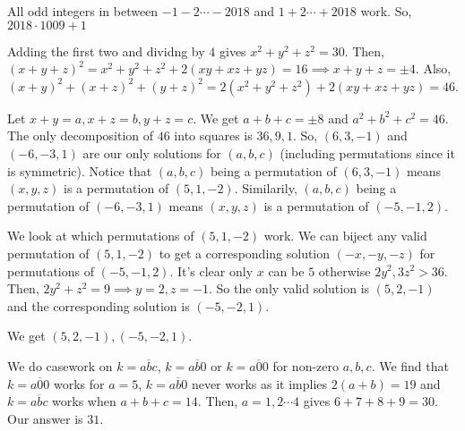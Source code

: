 \documentclass[11pt]{article}
\begin{document}

\begin{sol}
All odd integers in between $-1-2\cdots - 2018$ and $1+2\cdots + 2018$ work. So, $\boxed{2018\cdot 1009+1}$
\end{sol}

\begin{sol} 
Adding the first two and dividng by $4$ gives $x^2+y^2+z^2=30$. Then, $(x+y+z)^2=x^2+y^2+z^2+2(xy+xz+yz)=16\implies x+y+z=\pm 4$. Also, $(x+y)^2+(x+z)^2+(y+z)^2=2(x^2+y^2+z^2)+2(xy+xz+yz)=46$. 

Let $x+y=a, x+z=b, y+z=c$. We get $a+b+c=\pm 8$ and $a^2+b^2+c^2=46$. The only decomposition of $46$ into squares is $36,9,1$. So, $(6,3,-1)$ and $(-6,-3,1)$ are our only solutions for $(a,b,c)$ (including permutations since it is symmetric). Notice that $(a,b,c)$ being a permutation of $(6,3,-1)$ means $(x,y,z)$ is a permutation of $(5,1,-2)$. Similarily, $(a,b,c)$ being a permutation of $(-6,-3,1)$ means $(x,y,z)$ is a permutation of $(-5,-1,2)$.

We look at which permutations of $(5,1,-2)$ work. We can biject any valid permutation of $(5,1,-2)$ to get a corresponding solution $(-x,-y,-z)$ for permutations of $(-5,-1,2)$. It's clear only $x$ can be $5$ otherwise $2y^2,3z^2>36$. Then, $2y^2+z^2=9\implies y=2,z=-1$. So the only valid solution is $(5,2,-1)$ and the corresponding solution is $(-5,-2,1)$.

We get $\boxed{(5,2,-1),(-5,-2,1)}$.
\end{sol}


\begin{sol}
We do casework on $k=\overline{abc}$, $k=\overline{ab0}$ or $k=\overline{a00}$ for non-zero $a,b,c$. We find that $k=\overline{a00}$ works for $a=5$, $k=\overline{ab0}$ never works as it implies $2(a+b)=19$ and $k=\overline{abc}$ works when $a+b+c=14$. Then, $a=1,2\cdots 4$ gives $6+7+8+9= 30$. Our answer is $\boxed{31}$.
\end{sol}

\end{document}
